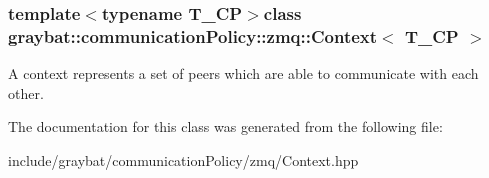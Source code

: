 \subsubsection*{template$<$typename T\+\_\+\+C\+P$>$class graybat\+::communication\+Policy\+::zmq\+::\+Context$<$ T\+\_\+\+C\+P $>$}

A context represents a set of peers which are able to communicate with each other. 

The documentation for this class was generated from the following file\+:\begin{DoxyCompactItemize}
\item 
include/graybat/communication\+Policy/zmq/Context.\+hpp\end{DoxyCompactItemize}
